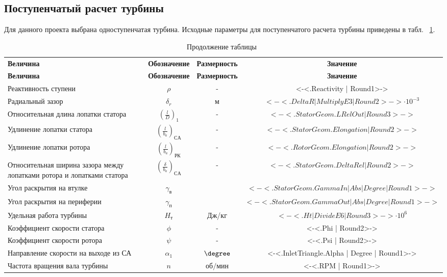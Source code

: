 \subsection{Поступенчатый расчет турбины}
Для данного проекта выбрана одноступенчатая турбина.
Исходные параметры для поступенчатого расчета турбины приведены в табл. ~\ref{turbine:midline_inlet}.
\begin{center}
	\begin{longtable}{|p{4cm}|c|c|c|}
		\caption{Исходные параметры поступенчатого расчета турбины}
		\label{turbine:midline_inlet}
		\endfirsthead
		\caption*{\tabcapalign Продолжение таблицы~\thetable}\\[-0.45\onelineskip]
		\hline
		\textbf{Величина} & \textbf{Обозначение} & \textbf{Размерность} & \textbf{Значение} \\ \hline
		\endhead
		\hline
		\textbf{Величина} & \textbf{Обозначение} & \textbf{Размерность} & \textbf{Значение} \\ \hline
			Реактивность ступени & $\rho$ & - & <-<.Reactivity | Round1>->  \\ \hline
			Радиальный зазор & $\delta_r$ & м & $<-<.DeltaR | MultiplyE3 | Round2>-> \cdot 10^{-3}$ \\ \hline
			Относительная длина лопатки статора & $\left( \frac{l}{D} \right)_1$ & - & $<-<.StatorGeom.LRelOut | Round3>->$ \\ \hline
			Удлинение лопатки статора & $\left( \frac{l}{b_a} \right)_{СА}$ & - & $<-<.StatorGeom.Elongation | Round2>->$ \\ \hline
			Удлинение лопатки ротора & $\left( \frac{l}{b_a} \right)_{РК}$ & - & $<-<.RotorGeom.Elongation | Round2>->$ \\ \hline
			Относительная ширина зазора между лопатками ротора и лопатками статора & $\left( \frac{\delta}{b_a} \right)_{СА}$ & - & $<-<.StatorGeom.DeltaRel | Round2>->$ \\ \hline
			Угол раскрытия на втулке & $\gamma_{в}$ & \degree & $<-<.StatorGeom.GammaIn | Abs | Degree | Round1>->$ \\ \hline
			Угол раскрытия на периферии & $\gamma_{п}$ & \degree & $<-<.StatorGeom.GammaOut | Abs | Degree | Round1>->$ \\ \hline
			Удельная работа турбины & $H_т$ & Дж/кг & $<-<.Ht | DivideE6 | Round3>-> \cdot 10^6$ \\ \hline
			Коэффициент скорости статора & $\phi$ & - & <-<.Phi | Round2>-> \\ \hline
			Коэффициент скорости ротора & $\psi$ & - & <-<.Psi | Round2>-> \\ \hline
			Направление скорости на выходе из СА & $\alpha_1$ & $\degree$ & <-<.InletTriangle.Alpha | Degree | Round1>-> \\ \hline
			Частота вращения вала турбины & $n$ & $об/мин$ & <-<.RPM | Round1>-> \\ \hline
	\end{longtable}
\end{center}

